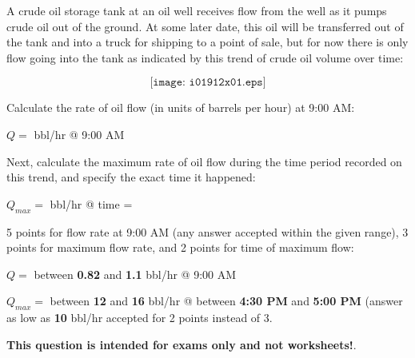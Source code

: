 

A crude oil storage tank at an oil well receives flow from the well as it pumps crude oil out of the ground.  At some later date, this oil will be transferred out of the tank and into a truck for shipping to a point of sale, but for now there is only flow going into the tank as indicated by this trend of crude oil volume over time:

$$\texttt{[image: i01912x01.eps]}$$

Calculate the rate of oil flow (in units of barrels per hour) at 9:00 AM:

\vskip 10pt

$Q = $ \underbar{\hskip 50pt} bbl/hr @ 9:00 AM

\vskip 20pt

Next, calculate the maximum rate of oil flow during the time period recorded on this trend, and specify the exact time it happened:

\vskip 10pt

$Q_{max} = $ \underbar{\hskip 50pt} bbl/hr @ time = \underbar{\hskip 50pt}







5 points for flow rate at 9:00 AM (any answer accepted within the given range), 3 points for maximum flow rate, and 2 points for time of maximum flow:

\vskip 10pt

$Q = $ between {\bf 0.82} and {\bf 1.1} bbl/hr @ 9:00 AM

\vskip 10pt

$Q_{max} = $ between {\bf 12} and {\bf 16} bbl/hr @ between {\bf 4:30 PM} and {\bf 5:00 PM}  (answer as low as {\bf 10} bbl/hr accepted for 2 points instead of 3.







{\bf This question is intended for exams only and not worksheets!}.



